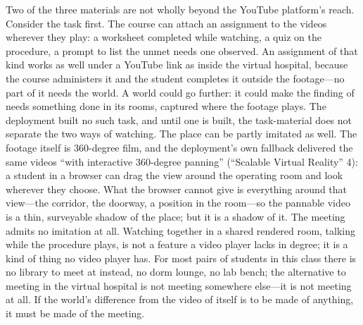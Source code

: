 Two of the three materials are not wholly beyond the YouTube
platform's reach. Consider the task first. The course can attach an
assignment to the videos wherever they play: a worksheet completed
while watching, a quiz on the procedure, a prompt to list the unmet
needs one observed. An assignment of that kind works as well under a
YouTube link as inside the virtual hospital, because the course
administers it and the student completes it outside the footage---no
part of it needs the world. A world could go further: it could make
the finding of needs something done in its rooms, captured where the
footage plays. The deployment built no such task, and until one is
built, the task-material does not separate the two ways of watching.
The place can be partly imitated as well. The footage itself is
360-degree film, and the deployment's own fallback delivered the same
videos ``with interactive 360-degree panning'' (``Scalable Virtual
Reality'' 4): a student in a browser can drag the view around the
operating room and look wherever they choose. What the browser cannot
give is everything around that view---the corridor, the doorway, a
position in the room---so the pannable video is a thin, surveyable
shadow of the place; but it is a shadow of it. The meeting admits no
imitation at all. Watching together in a shared rendered room,
talking while the procedure plays, is not a feature a video player
lacks in degree; it is a kind of thing no video player has. For most
pairs of students in this class there is no library to meet at
instead, no dorm lounge, no lab bench; the alternative to meeting in
the virtual hospital is not meeting somewhere else---it is not meeting
at all. If the world's difference from the video of itself is to be
made of anything, it must be made of the meeting.

